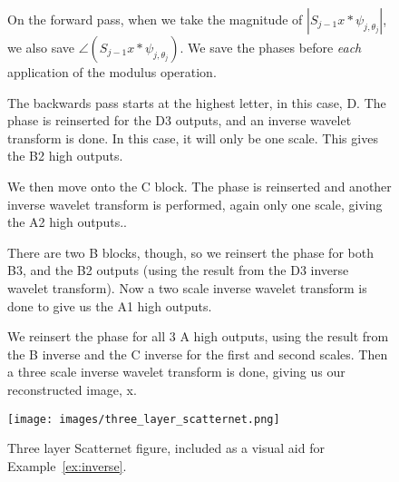   \begin{figure}

  \begin{exmp}\label{ex:inverse}
    On the forward pass, when we take the magnitude of $|S_{j-1}x \ast
      \psi_{j,\theta_j}|$, we also save $\angle (S_{j-1}x \ast
      \psi_{j,\theta_j})$. We save the phases before \emph{each}
      application of the modulus operation.
    
    The backwards pass starts at the highest letter, in this case, D. The phase
    is reinserted for the D3 outputs, and an inverse wavelet transform is done.
    In this case, it will only be one scale. This gives the B2 high outputs.

    We then move onto the C block. The phase is reinserted and another inverse
    wavelet transform is performed, again only one scale, giving the A2 high
    outputs..

    There are two B blocks, though, so we reinsert the phase for both B3, and
    the B2 outputs (using the result from the D3 inverse wavelet transform).
    Now a two scale inverse wavelet transform is done to give us the A1 high
    outputs.

    We reinsert the phase for all 3 A high outputs, using the result from the
    B inverse and the C inverse for the first and second scales. Then a three
    scale inverse wavelet transform is done, giving us our reconstructed image,
    x.
  \end{exmp}
    \vspace{2cm}
    \centering
    \texttt{[image: images/three\_layer\_scatternet.png]}
    \caption{Three layer Scatternet figure, included as a visual aid for
    Example~\ref{ex:inverse}.}
    \label{fig:three_layer_scat}
  \end{figure}

  

  
